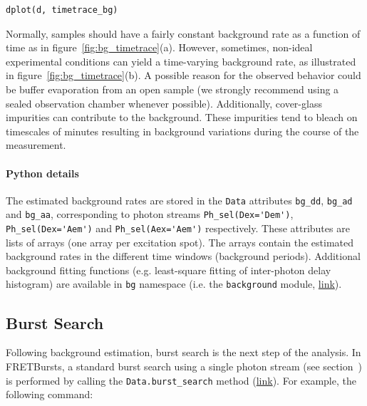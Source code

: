 \documentclass[10pt,letterpaper]{article}
\begin{document}
\begin{lstlisting}
dplot(d, timetrace_bg)
\end{lstlisting}

Normally, samples should have a fairly constant background rate as a function of time
as in figure~\ref{fig:bg_timetrace}(a). However, sometimes, non-ideal
experimental conditions can yield a time-varying background rate, as illustrated in
figure~\ref{fig:bg_timetrace}(b).
A possible reason for the observed behavior could be buffer evaporation from an open sample
(we strongly recommend using a sealed 
observation chamber whenever possible). Additionally,
cover-glass impurities can contribute to the background.
These impurities tend to bleach on timescales of minutes resulting in
background variations during the course of the measurement.

\paragraph*{Python details}

The estimated background rates are stored in the \verb|Data| attributes
\verb|bg_dd|, \verb|bg_ad| and \verb|bg_aa|, corresponding to photon
streams \verb|Ph_sel(Dex='Dem')|, \verb|Ph_sel(Dex='Aem')| and \verb|Ph_sel(Aex='Aem')|
respectively.
These attributes are lists of arrays (one array per excitation spot).
The arrays contain the estimated background rates in the different time windows
(background periods).
Additional background fitting functions (e.g. least-square fitting of inter-photon delay
histogram) are available in \verb|bg| namespace
(i.e. the \verb|background| module,
\href{http://fretbursts.readthedocs.org/en/latest/background.html}{link}).


\subsection*{Burst Search}
\label{sec:burstsearch}


Following background estimation, burst search is the next step of
the analysis.
In FRETBursts, a standard burst search using a single photon stream
(see section~) is performed by calling the
\verb|Data.burst_search| method
(\href{http://fretbursts.readthedocs.org/en/latest/data_class.html#fretbursts.burstlib.Data.burst_search}{link}).
For example, the following command:
\end{document}
